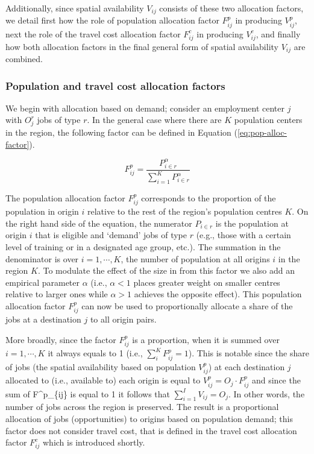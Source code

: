 \documentclass[]{elsarticle} %
\begin{document}
Additionally, since spatial availability \(V_{ij}\) consists of these
two allocation factors, we detail first how the role of population
allocation factor \(F^p_{ij}\) in producing \(V^p_{ij}\), next the role
of the travel cost allocation factor \(F^c_{ij}\) in producing
\(V^c_{ij}\), and finally how both allocation factors in the final
general form of spatial availability \(V_{ij}\) are combined.

\hypertarget{population-and-travel-cost-allocation-factors}{%
\subsubsection{Population and travel cost allocation
factors}\label{population-and-travel-cost-allocation-factors}}

We begin with allocation based on demand; consider an employment center
\(j\) with \(O_j^r\) jobs of type \(r\). In the general case where there
are \(K\) population centers in the region, the following factor can be
defined in Equation (\ref{eq:pop-alloc-factor}).

\begin{equation}
\label{eq:pop-alloc-factor}
F^p_{ij} = \frac{P_{i\in r}^\alpha}{\sum_{i=1}^K P_{i\in r}^\alpha}
\end{equation}

The population allocation factor \(F^p_{ij}\) corresponds to the
proportion of the population in origin \(i\) relative to the rest of the
region's population centres \(K\). On the right hand side of the
equation, the numerator \(P_{i\in r}\) is the population at origin \(i\)
that is eligible and `demand' jobs of type \(r\) (e.g., those with a
certain level of training or in a designated age group, etc.). The
summation in the denominator is over \(i=1,\cdots,K\), the number of
population at all origins \(i\) in the region \(K\). To modulate the
effect of the size in from this factor we also add an empirical
parameter \(\alpha\) (i.e., \(\alpha <1\) places greater weight on
smaller centres relative to larger ones while \(\alpha>1\) achieves the
opposite effect). This population allocation factor \(F^p_{ij}\) can now
be used to proportionally allocate a share of the jobs at a destination
\(j\) to all origin pairs.

More broadly, since the factor \(F^p_{ij}\) is a proportion, when it is
summed over \(i=1,\cdots,K\) it always equals to 1 (i.e.,
\(\sum_i^{K} F^p_{ij} = 1\)). This is notable since the share of jobs
(the spatial availability based on population \(V^p_{ij}\)) at each
destination \(j\) allocated to (i.e., available to) each origin is equal
to \(V^p_{ij} = O_j \cdot F^p_{ij}\) and since the sum of F\^{}p\_\{ij\}
is equal to 1 it follows that \(\sum_{i=1}^I V_{ij} = O_j\). In other
words, the number of jobs across the region is preserved. The result is
a proportional allocation of jobs (opportunities) to origins based on
population demand; this factor does not consider travel cost, that is
defined in the travel cost allocation factor \(F^c_{ij}\) which is
introduced shortly.
\end{document}
